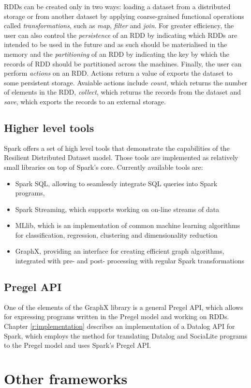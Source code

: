 RDDs can be created only in two ways: loading a dataset from a distributed storage or from another dataset by applying coarse-grained functional operations called \emph{transformations}, such as \emph{map}, \emph{filter} and \emph{join}. For greater efficiency, the user can also control the \emph{persistence} of an RDD by indicating which RDDs are intended to be used in the future and as such should be materialised in the memory and the \emph{partitioning} of an RDD by indicating the key by which the records of RDD should be partitioned across the machines. Finally, the user can perform \emph{actions} on an RDD. Actions return a value of exports the dataset to some persistent storage. Avaiable actions include \emph{count}, which returns the number of elements in the RDD, \emph{collect}, which returns the records from the dataset and \emph{save}, which exports the records to an external storage.

\subsection{Higher level tools}
Spark offers a set of high level tools that demonstrate the capabilities of the Resilient Distributed Dataset model. Those tools are implemented as relatively small libraries on top of Spark's core. Currently available tools are:
\begin{itemize}
\item Spark SQL, allowing to seamlessly integrate SQL queries into Spark programs,
\item Spark Streaming, which supports working on on-line streams of data
\item MLlib, which is an implementation of common machine learning algorithms for classification, regression, clustering and dimensionality reduction
\item GraphX, providing an interface for creating efficient graph algorithms, integrated with pre- and post- processing with regular Spark transformations
\end{itemize}

\subsection{Pregel API}
One of the elements of the GraphX library is a general Pregel API, which allows for expressing programs written in the Pregel model and working on RDDs.
Chapter \ref{r:implementation} describes an implementation of a Datalog API for Spark, which employs the method for translating Datalog and SociaLite programs to the Pregel model and uses Spark's Pregel API.

\section{Other frameworks}


